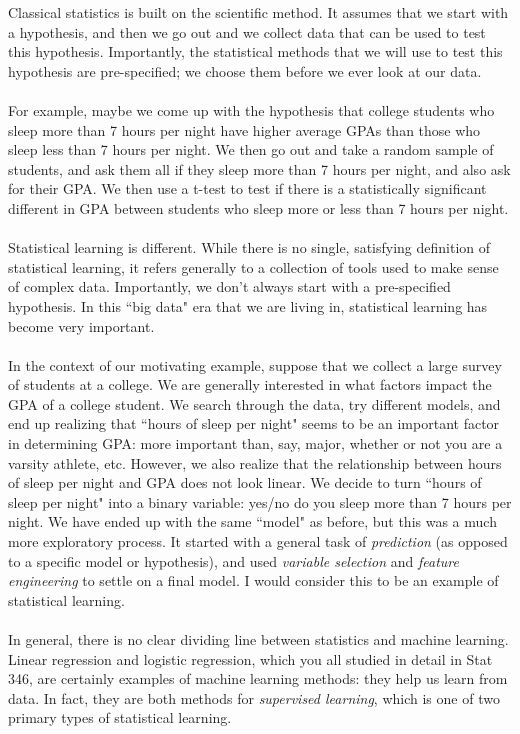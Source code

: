 \documentclass[titlepage,10pt]{scrartcl}
\begin{document}
Classical statistics is built on the scientific method. It assumes that we start with a hypothesis, and then we go out and we collect data that can be used to test this hypothesis. Importantly, the statistical methods that we will use to test this hypothesis are pre-specified; we choose them before we ever look at our data. \\
\\
For example, maybe we come up with the hypothesis that college students who sleep more than 7 hours per night have higher average GPAs than those who sleep less than 7 hours per night. We then go out and take a random sample of students, and ask them all if they sleep more than 7 hours per night, and also ask for their GPA. We then use a t-test to test if there is a statistically significant different in GPA between students who sleep more or less than 7 hours per night. \\
\\
Statistical learning is different. While there is no single, satisfying definition of statistical learning, it refers generally to a collection of tools used to make sense of complex data. Importantly, we don't always start with a pre-specified hypothesis. In this ``big data" era that we are living in, statistical learning has become very important. \\
\\
In the context of our motivating example, suppose that we collect a large survey of students at a college. We are generally interested in what factors impact the GPA of a college student. We search through the data, try different models, and end up realizing that ``hours of sleep per night" seems to be an important factor in determining GPA: more important than, say, major, whether or not you are a varsity athlete, etc. However, we also realize that the relationship between hours of sleep per night and GPA does not look linear. We decide to turn ``hours of sleep per night" into a binary variable: yes/no do you sleep more than 7 hours per night. We have ended up with the same ``model" as before, but this was a much more exploratory process. It started with a general task of \emph{prediction} (as opposed to a specific model or hypothesis), and used \emph{variable selection} and \emph{feature engineering} to settle on a final model. I would consider this to be an example of statistical learning. \\
\\
In general, there is no clear dividing line between statistics and machine learning. Linear regression and logistic regression, which you all studied in detail in Stat 346, are certainly examples of machine learning methods: they help us learn from data. In fact, they are both methods for \emph{supervised learning}, which is one of two primary types of statistical learning. 
\end{document}
